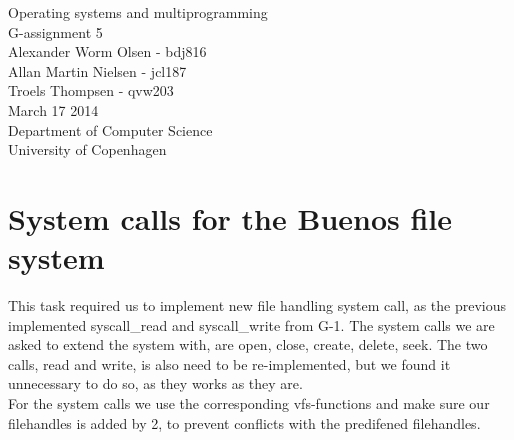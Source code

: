 \documentclass[12pt,a4paper,danish]{article}
\begin{document}
\begin{titlepage}
    \vspace*{\fill}
    \begin{center}
      {\Huge Operating systems and multiprogramming}\\[0.7cm]
      {\huge G-assignment 5}\\[0.7cm]
      {\large Alexander Worm Olsen - bdj816}\\[0.4cm]
      {\large Allan Martin Nielsen - jcl187}\\[0.4cm]
      {\large Troels Thompsen - qvw203}\\[0.4cm]
      {\small March 17 2014}\\[0.3cm] 
      {\small Department of Computer Science}\\
      {\small University of Copenhagen}
    \end{center}
    \vspace*{\fill}
\end{titlepage}

\section{System calls for the Buenos file system}
This task required us to implement new file handling system call, as the previous implemented syscall\_read and syscall\_write from G-1. The system calls we are asked to extend the system with, are open, close, create, delete, seek.
The two calls, read and write, is also need to be re-implemented, but we found it unnecessary to do so, as they works as they are.\\
For the system calls we use the corresponding vfs-functions and make sure our filehandles is added by 2, to prevent conflicts with the predifened filehandles.
\end{document}

